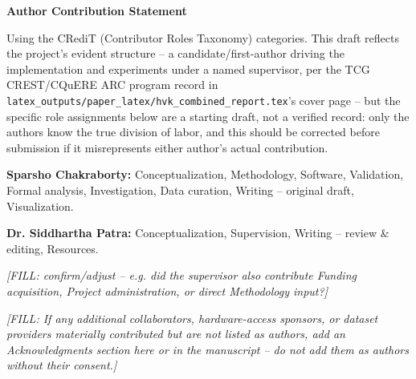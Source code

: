 \documentclass[11pt]{article}
\begin{document}
\begin{center}
{\Large\bfseries Author Contribution Statement}
\end{center}

\bigskip
\noindent Using the CRediT (Contributor Roles Taxonomy) categories. This draft reflects the project's evident structure -- a candidate/first-author driving the implementation and experiments under a named supervisor, per the TCG CREST/CQuERE ARC program record in \texttt{latex\_outputs/paper\_latex/hvk\_combined\_report.tex}'s cover page -- but the specific role assignments below are a starting draft, not a verified record: only the authors know the true division of labor, and this should be corrected before submission if it misrepresents either author's actual contribution.

\bigskip
\noindent \textbf{Sparsho Chakraborty:} Conceptualization, Methodology, Software, Validation, Formal analysis, Investigation, Data curation, Writing -- original draft, Visualization.

\bigskip
\noindent \textbf{Dr. Siddhartha Patra:} Conceptualization, Supervision, Writing -- review \& editing, Resources.

\bigskip
\noindent \emph{[FILL: confirm/adjust -- e.g. did the supervisor also contribute Funding acquisition, Project administration, or direct Methodology input?]}

\bigskip
\noindent \emph{[FILL: If any additional collaborators, hardware-access sponsors, or dataset providers materially contributed but are not listed as authors, add an Acknowledgments section here or in the manuscript -- do not add them as authors without their consent.]}
\end{document}
